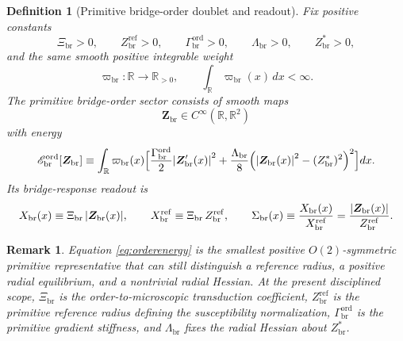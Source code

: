 \documentclass[11pt]{article}
\newcommand{\ProfWeight}{\varpi_{\mathrm{br}}}
\newcommand{\RespSus}{\Sigma_{\mathrm{br}}}
\newcommand{\RespMicro}{X_{\mathrm{br}}}
\newcommand{\RespMicroRef}{X_{\mathrm{br}}^{\mathrm{ref}}}
\newcommand{\RespOrderField}{\bm Z_{\mathrm{br}}}
\newcommand{\RespOrderRef}{Z_{\mathrm{br}}^{\mathrm{ref}}}
\newcommand{\RespOrderEq}{Z_{\mathrm{br}}^{\ast}}
\newcommand{\RespOrderReadout}{\Xi_{\mathrm{br}}}
\newcommand{\RespOrderStiff}{\Gamma_{\mathrm{br}}^{\mathrm{ord}}}
\newcommand{\RespOrderQuartic}{\Lambda_{\mathrm{br}}}
\newcommand{\RespOrderEnergy}{\mathscr E_{\mathrm{br}}^{\mathrm{ord}}}
\newtheorem{definition}{Definition}
\newtheorem{remark}{Remark}
\begin{document}
\begin{definition}[Primitive bridge-order doublet and readout]
\label{def:order}
Fix positive constants
\begin{equation}
\RespOrderReadout>0,
\qquad
\RespOrderRef>0,
\qquad
\RespOrderStiff>0,
\qquad
\RespOrderQuartic>0,
\qquad
\RespOrderEq>0,
\label{eq:orderconstants}
\end{equation}
and the same smooth positive integrable weight
\begin{equation}
\ProfWeight:\mathbb R\to\mathbb R_{>0},
\qquad
\int_{\mathbb R}\ProfWeight(x)\,dx<\infty.
\label{eq:weight}
\end{equation}
The \emph{primitive bridge-order sector} consists of smooth maps
\begin{equation}
\RespOrderField\in C^\infty(\mathbb R,\mathbb R^2)
\label{eq:orderfield}
\end{equation}
with energy
\begin{equation}
\RespOrderEnergy[\RespOrderField]
\equiv
\int_{\mathbb R}\ProfWeight(x)\Bigl[
\frac{\RespOrderStiff}{2}\abs{\RespOrderField'(x)}^2
+
\frac{\RespOrderQuartic}{8}\Bigl(\abs{\RespOrderField(x)}^2-(\RespOrderEq)^2\Bigr)^2
\Bigr]dx.
\label{eq:orderenergy}
\end{equation}
Its bridge-response readout is
\begin{equation}
\RespMicro(x)\equiv \RespOrderReadout\,\abs{\RespOrderField(x)},
\qquad
\RespMicroRef\equiv \RespOrderReadout\,\RespOrderRef,
\qquad
\RespSus(x)\equiv \frac{\RespMicro(x)}{\RespMicroRef}=\frac{\abs{\RespOrderField(x)}}{\RespOrderRef}.
\label{eq:microreadout}
\end{equation}
\end{definition}

\begin{remark}
Equation \eqref{eq:orderenergy} is the smallest positive \(O(2)\)-symmetric primitive representative that can still distinguish a reference radius, a positive radial equilibrium, and a nontrivial radial Hessian. At the present disciplined scope, \(\RespOrderReadout\) is the order-to-microscopic transduction coefficient, \(\RespOrderRef\) is the primitive reference radius defining the susceptibility normalization, \(\RespOrderStiff\) is the primitive gradient stiffness, and \(\RespOrderQuartic\) fixes the radial Hessian about \(\RespOrderEq\).
\end{remark}
\end{document}
